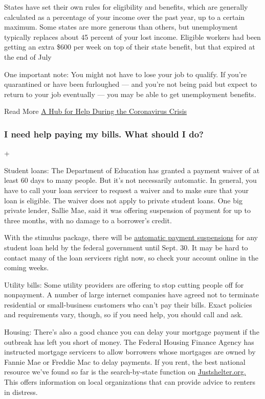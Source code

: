 States have set their own rules for eligibility and benefits, which are
generally calculated as a percentage of your income over the past year,
up to a certain maximum. Some states are more generous than others, but
unemployment typically replaces about 45 percent of your lost income.
Eligible workers had been getting an extra \$600 per week on top of
their state benefit, but that expired at the end of July

One important note: You might not have to lose your job to qualify. If
you're quarantined or have been furloughed --- and you're not being paid
but expect to return to your job eventually --- you may be able to get
unemployment benefits.

Read More
\href{https://www.nytimes3xbfgragh.onion/article/coronavirus-money-unemployment.html}{A
Hub for Help During the Coronavirus Crisis}

\hypertarget{i-need-help-paying-my-bills-what-should-i-do}{%
\subsubsection{I need help paying my bills. What should I
do?}\label{i-need-help-paying-my-bills-what-should-i-do}}

+

Student loans: The Department of Education has granted a payment waiver
of at least 60 days to many people. But it's not necessarily automatic.
In general, you have to call your loan servicer to request a waiver and
to make sure that your loan is eligible. The waiver does not apply to
private student loans. One big private lender, Sallie Mae, said it was
offering suspension of payment for up to three months, with no damage to
a borrower's credit.

With the stimulus package, there will be
\href{https://www.nytimes3xbfgragh.onion/article/coronavirus-stimulus-package-questions-answers.html}{automatic
payment suspensions} for any student loan held by the federal government
until Sept. 30. It may be hard to contact many of the loan servicers
right now, so check your account online in the coming weeks.

Utility bills: Some utility providers are offering to stop cutting
people off for nonpayment. A number of large internet companies have
agreed not to terminate residential or small-business customers who
can't pay their bills. Exact policies and requirements vary, though, so
if you need help, you should call and ask.

Housing: There's also a good chance you can delay your mortgage payment
if the outbreak has left you short of money. The Federal Housing Finance
Agency has instructed mortgage servicers to allow borrowers whose
mortgages are owned by Fannie Mae or Freddie Mac to delay payments. If
you rent, the best national resource we've found so far is the
search-by-state function on
\href{https://justshelter.org/community-resources/}{Justshelter.org.}
This offers information on local organizations that can provide advice
to renters in distress.

